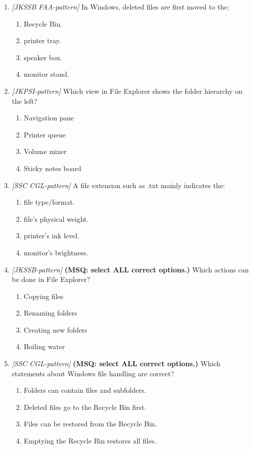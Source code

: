 \documentclass[11pt]{article}
\begin{document}
\begin{enumerate}[label=\textbf{Q\arabic*.}, leftmargin=*]
\item \textit{[JKSSB FAA-pattern]} In Windows, deleted files are first moved to the:
  \begin{enumerate}[label=\Alph*.]
    \item Recycle Bin.
    \item printer tray.
    \item speaker box.
    \item monitor stand.
  \end{enumerate}
\item \textit{[JKPSI-pattern]} Which view in File Explorer shows the folder hierarchy on the left?
  \begin{enumerate}[label=\Alph*.]
    \item Navigation pane
    \item Printer queue
    \item Volume mixer
    \item Sticky notes board
  \end{enumerate}
\item \textit{[SSC CGL-pattern]} A file extension such as .txt mainly indicates the:
  \begin{enumerate}[label=\Alph*.]
    \item file type/format.
    \item file's physical weight.
    \item printer's ink level.
    \item monitor's brightness.
  \end{enumerate}
\item \textit{[JKSSB-pattern]} \textbf{(MSQ: select ALL correct options.)} Which actions can be done in File Explorer?
  \begin{enumerate}[label=\Alph*.]
    \item Copying files
    \item Renaming folders
    \item Creating new folders
    \item Boiling water
  \end{enumerate}
\item \textit{[SSC CGL-pattern]} \textbf{(MSQ: select ALL correct options.)} Which statements about Windows file handling are correct?
  \begin{enumerate}[label=\Alph*.]
    \item Folders can contain files and subfolders.
    \item Deleted files go to the Recycle Bin first.
    \item Files can be restored from the Recycle Bin.
    \item Emptying the Recycle Bin restores all files.
  \end{enumerate}
\end{enumerate}
\def\JKSSBLessonID{20}\def\JKSSBAnswers{0}
\end{document}
